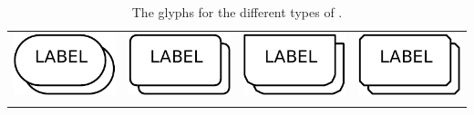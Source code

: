 \begin{table}[h]
\begin{tabu}{X[c,m]X[c,m]X[c,m]X[c,m]}
    \toprule
    \includegraphics[valign=m]{images/build/simple_chemical_multimer.pdf} & \includegraphics[valign=m]{images/build/macromolecule_multimer.pdf} & \includegraphics[valign=m]{images/build/genetic_multimer.pdf} & \includegraphics[valign=m]{images/build/complex_multimer.pdf}\\[0.5cm]
     &  &  & \\
	\bottomrule
\end{tabu}
\caption{The \PD glyphs for the different types of .}
\label{tab:multimer_containers}
\end{table}

% 

